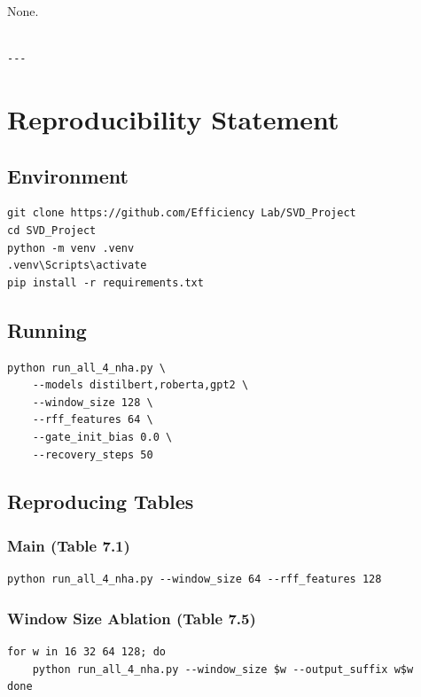 None.
\begin{lstlisting}

---
\end{lstlisting}


\section{Reproducibility Statement}

\subsection{Environment}

\begin{lstlisting}
git clone https://github.com/Efficiency Lab/SVD_Project
cd SVD_Project
python -m venv .venv
.venv\Scripts\activate
pip install -r requirements.txt
\end{lstlisting}

\subsection{Running}

\begin{lstlisting}
python run_all_4_nha.py \
    --models distilbert,roberta,gpt2 \
    --window_size 128 \
    --rff_features 64 \
    --gate_init_bias 0.0 \
    --recovery_steps 50
\end{lstlisting}

\subsection{Reproducing Tables}

\subsubsection{Main (Table 7.1)}
\begin{lstlisting}
python run_all_4_nha.py --window_size 64 --rff_features 128
\end{lstlisting}

\subsubsection{Window Size Ablation (Table 7.5)}
\begin{lstlisting}
for w in 16 32 64 128; do
    python run_all_4_nha.py --window_size $w --output_suffix w$w
done
\end{lstlisting}

